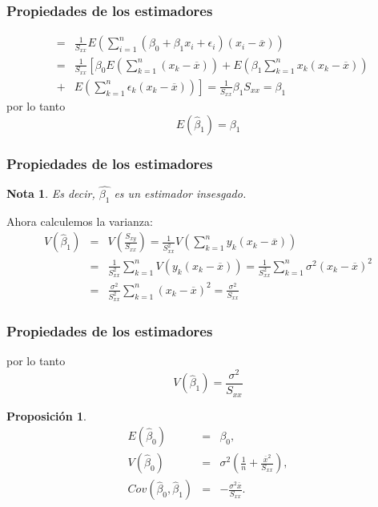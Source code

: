 \documentclass{beamer}
\newtheorem{Note}{Nota}[section]
\newtheorem{Prop}{Proposici\'on}[section]
\begin{document}
\begin{frame}\frametitle{Propiedades de los estimadores}
\begin{eqnarray*}
&=&\frac{1}{S_{xx}}E\left(\sum_{i=1}^{n}\left(\beta_{0}+\beta_{1}x_{i}+\epsilon_{i}\right)\left(x_{i}-\overline{x}\right)\right)\\
&=&\frac{1}{S_{xx}}\left[\beta_{0}E\left(\sum_{k=1}^{n}\left(x_{k}-\overline{x}\right)\right)+E\left(\beta_{1}\sum_{k=1}^{n}x_{k}\left(x_{k}-\overline{x}\right)\right)\right.\\
&+&\left.E\left(\sum_{k=1}^{n}\epsilon_{k}\left(x_{k}-\overline{x}\right)\right)\right]=\frac{1}{S_{xx}}\beta_{1}S_{xx}=\beta_{1}
\end{eqnarray*}
por lo tanto 
\begin{equation}\label{Esperanza.Beta.1}
E\left(\hat{\beta}_{1}\right)=\beta_{1}
\end{equation}
\end{frame}

\begin{frame}\frametitle{Propiedades de los estimadores}
\begin{Note}
Es decir, $\hat{\beta_{1}}$ es un estimador insesgado.
\end{Note}
Ahora calculemos la varianza:
\begin{eqnarray*}
V\left(\hat{\beta}_{1}\right)&=&V\left(\frac{S_{xy}}{S_{xx}}\right)=\frac{1}{S_{xx}^{2}}V\left(\sum_{k=1}^{n}y_{k}\left(x_{k}-\overline{x}\right)\right)\\
&=&\frac{1}{S_{xx}^{2}}\sum_{k=1}^{n}V\left(y_{k}\left(x_{k}-\overline{x}\right)\right)=\frac{1}{S_{xx}^{2}}\sum_{k=1}^{n}\sigma^{2}\left(x_{k}-\overline{x}\right)^{2}\\
&=&\frac{\sigma^{2}}{S_{xx}^{2}}\sum_{k=1}^{n}\left(x_{k}-\overline{x}\right)^{2}=\frac{\sigma^{2}}{S_{xx}}
\end{eqnarray*}

\end{frame}

\begin{frame}\frametitle{Propiedades de los estimadores}
por lo tanto
\begin{equation}\label{Varianza.Beta.1}
V\left(\hat{\beta}_{1}\right)=\frac{\sigma^{2}}{S_{xx}}
\end{equation}
\begin{Prop}
\begin{eqnarray*}
E\left(\hat{\beta}_{0}\right)&=&\beta_{0},\\
V\left(\hat{\beta}_{0}\right)&=&\sigma^{2}\left(\frac{1}{n}+\frac{\overline{x}^{2}}{S_{xx}}\right),\\
Cov\left(\hat{\beta}_{0},\hat{\beta}_{1}\right)&=&-\frac{\sigma^{2}\overline{x}}{S_{xx}}.
\end{eqnarray*}
\end{Prop}
\end{frame}
\end{document}
